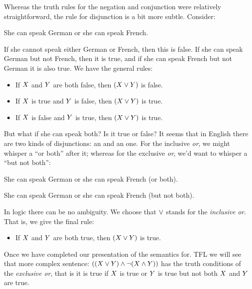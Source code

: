 Whereas the truth rules for the negation and conjunction were relatively straightforward, the rule for disjunction is a bit more subtle.
Consider:
\begin{earg}
\item[\ex{conj}] She can speak German or she can speak French.
\end{earg}
If she cannot speak either German or French, then this is false. If she can speak German but not French, then it is true, and if she can speak French but not German it is also true.
We have the general rules:
\begin{itemize}
\item If $X$ and $Y$ are both false, then $(X\vee Y)$ is false.
\item  If $X$ is true and $Y$ is false, then $(X\vee Y)$ is true.
\item  If $X$ is false and $Y$ is true, then $(X\vee Y)$ is true.
\end{itemize}

But what if she can speak both? Is it true or false?
It seems that in English there are two kinds of disjunctions: an  and an  one. For the inclusive \emph{or}, we might whisper a ``or both'' after it; whereas for the exclusive \emph{or}, we'd want to whisper a ``but not both'':
\begin{earg}
\item [\ex{inclor}] She can speak German or
she can speak French (or both).
\item [\ex{exclor}] She can speak German or
she can speak French (but not both).
\end{earg}

In logic there can be no ambiguity. We choose that $\vee$ stands for the \emph{inclusive or}.
That is, we give the final rule:
\begin{itemize}
\item If $X$ and $Y$ are both true, then $(X\vee Y)$ is true.
\end{itemize}


Once we have completed our presentation of the semantics for. TFL we will see that more complex sentence: $((X\vee Y)\mathbin{\wedge} \neg(X\mathbin{\wedge}Y))$ has the truth conditions of the \emph{exclusive or}, that is it is true if $X$ is true or $Y$ is true but not both $X$ and $Y$ are true.


